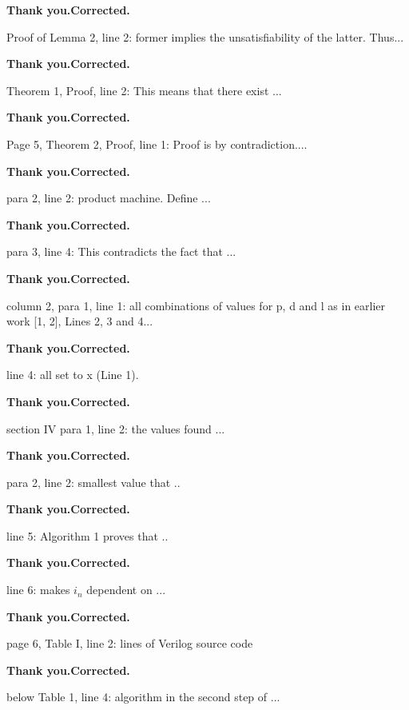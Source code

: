 \documentclass[journal]{IEEEtran}
\begin{document}
{\smallskip
\textbf{Thank you.Corrected.}
\smallskip

Proof of Lemma 2, line 2: former implies the unsatisfiability of the latter. Thus...

\smallskip
\textbf{Thank you.Corrected.}
\smallskip

Theorem 1, Proof, line 2: This means that there exist ...

\smallskip
\textbf{Thank you.Corrected.}
\smallskip

Page 5, Theorem 2, Proof, line 1: Proof is by contradiction....

\smallskip
\textbf{Thank you.Corrected.}
\smallskip

                                                para 2, line 2: product machine. Define ...

\smallskip
\textbf{Thank you.Corrected.}
\smallskip

                                                para 3, line 4: This contradicts the fact that ...

\smallskip
\textbf{Thank you.Corrected.}
\smallskip

column 2, para 1, line 1: all combinations of values for p, d and l as in earlier work [1, 2], Lines 2, 3 and 4...

\smallskip
\textbf{Thank you.Corrected.}
\smallskip

                                 line 4: all set to x (Line 1).

\smallskip
\textbf{Thank you.Corrected.}
\smallskip

section IV
para 1, line 2: the values found ...

\smallskip
\textbf{Thank you.Corrected.}
\smallskip

para 2, line 2: smallest value that ..

\smallskip
\textbf{Thank you.Corrected.}
\smallskip

             line 5: Algorithm 1 proves that ..

\smallskip
\textbf{Thank you.Corrected.}
\smallskip

             line 6:  makes $i_n$ dependent on ...

\smallskip
\textbf{Thank you.Corrected.}
\smallskip


page 6, Table I, line 2: lines of Verilog source code

\smallskip
\textbf{Thank you.Corrected.}
\smallskip

below Table 1, line 4: algorithm in the second step of ...

}
\end{document}
